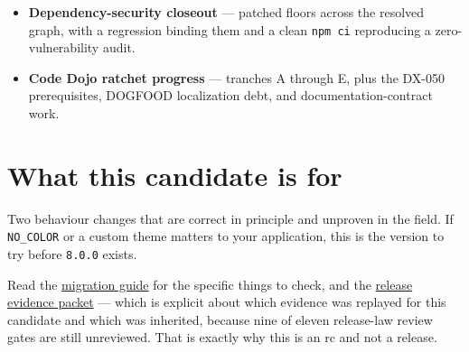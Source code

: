 \begin{itemize}
\item
  \textbf{Dependency-security closeout} --- patched floors across the resolved graph, with a regression binding them and a clean \texttt{n\allowbreak{}p\allowbreak{}m\allowbreak{} \allowbreak{}c\allowbreak{}i} reproducing a zero-vulnerability audit.
\item
  \textbf{Code Dojo ratchet progress} --- tranches A through E, plus the DX-050 prerequisites, DOGFOOD localization debt, and documentation-contract work.
\end{itemize}

\section{What this candidate is for}\label{record-284-what-this-candidate-is-for}

Two behaviour changes that are correct in principle and unproven in the field. If \texttt{N\allowbreak{}O\allowbreak{}\_\allowbreak{}C\allowbreak{}O\allowbreak{}L\allowbreak{}O\allowbreak{}R} or a custom theme matters to your application, this is the version to try before \texttt{8\allowbreak{}.\allowbreak{}0\allowbreak{}.\allowbreak{}0} exists.

Read the \href{https://github.com/flyingrobots/bijou/blob/cbd70612140e7a450d764b3c7be1c6af878b99bc/docs/releases/8.0.0/migration-guide.md}{migration guide} for the specific things to check, and the \href{https://github.com/flyingrobots/bijou/blob/cbd70612140e7a450d764b3c7be1c6af878b99bc/docs/releases/8.0.0/README.md}{release evidence packet} --- which is explicit about which evidence was replayed for this candidate and which was inherited, because nine of eleven release-law review gates are still unreviewed. That is exactly why this is an rc and not a release.


